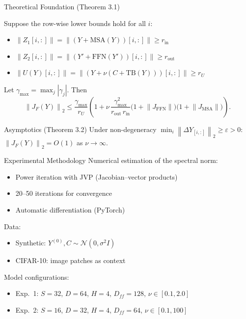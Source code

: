 \documentclass{beamer}
\newcommand{\norm}[1]{\left\|#1\right\|}
\newcommand{\TB}{\mathrm{TB}}
\newcommand{\MSA}{\mathrm{MSA}}
\newcommand{\FFN}{\mathrm{FFN}}
\newcommand{\rU}{r_{U}}
\newcommand{\rin}{r_{\mathrm{in}}}
\newcommand{\rout}{r_{\mathrm{out}}}
\newcommand{\gmax}{\gamma_{\max}}
\begin{document}
\begin{frame}{Theoretical Foundation (Theorem 3.1)}
    \begin{theorem}
        Suppose the row-wise lower bounds hold for all $i$:
        \begin{itemize}
            \item $\norm{Z_1[i,:]} = \norm{(Y + \MSA(Y))[i,:]} \ge \rin$
            \item $\norm{Z_2[i,:]} = \norm{(Y' + \FFN(Y'))[i,:]} \ge \rout$
            \item $\norm{U(Y)[i,:]} = \norm{(Y + \nu(C + \TB(Y)))[i,:]} \ge \rU$
        \end{itemize}
        Let $\gmax = \max_j |\gamma_j|$. Then
        \begin{equation*}
            \norm{J_F(Y)}_2 \le
            \frac{\gmax}{\rU}
            \left(
                1 +
                \nu \,\frac{\gmax^2}{\rout\,\rin}
                \bigl(1 + \norm{J_{\FFN}}\bigr)\bigl(1 + \norm{J_{\MSA}}\bigr)
            \right).
        \end{equation*}
    \end{theorem}

    \begin{block}{Asymptotics (Theorem 3.2)}
        Under non-degeneracy $\min_i\norm{\Delta Y_{[i,:]}}_2 \ge \varepsilon > 0$:
        $\norm{J_F(Y)}_2 = O(1)$ as $\nu \to \infty$.
    \end{block}
\end{frame}

\begin{frame}{Experimental Methodology}
    Numerical estimation of the spectral norm:
    \begin{itemize}
        \item Power iteration with JVP (Jacobian--vector products)
        \item 20--50 iterations for convergence
        \item Automatic differentiation (PyTorch)
    \end{itemize}

    \vspace{0.5em}
    Data:
    \begin{itemize}
        \item Synthetic: $Y^{(0)}, C \sim \mathcal{N}(0, \sigma^2 I)$
        \item CIFAR-10: image patches as context
    \end{itemize}

    \vspace{0.5em}
    Model configurations:
    \begin{itemize}
        \item Exp.\ 1: $S=32$, $D=64$, $H=4$, $D_{ff}=128$, $\nu \in [0.1, 2.0]$
        \item Exp.\ 2: $S=16$, $D=32$, $H=4$, $D_{ff}=64$, $\nu \in [0.1, 100]$
    \end{itemize}
\end{frame}
\end{document}
